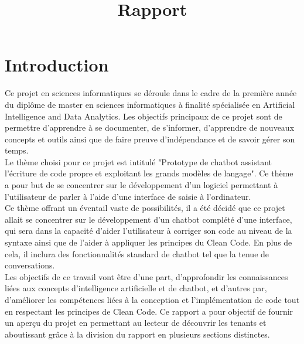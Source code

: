 \documentclass{rapport}
\title{Rapport} %
\begin{document}




        
\fairemarges %
\fairepagedegarde %
\tabledematieres %



\section{Introduction} 
Ce projet en sciences informatiques se déroule dans le cadre de la première année du diplôme de master en sciences informatiques à finalité spécialisée en Artificial Intelligence and Data Analytics. Les objectifs principaux de ce projet sont de permettre d'apprendre à se documenter, de s'informer, d'apprendre de nouveaux concepts et outils ainsi que de faire preuve d'indépendance et de savoir gérer son temps.\\

Le thème choisi pour ce projet est intitulé "Prototype de chatbot assistant l'écriture de code propre et exploitant les grands modèles de langage". Ce thème a pour but de se concentrer sur le développement d'un logiciel permettant à l'utilisateur de parler à l'aide d'une interface de saisie à l'ordinateur.\\

Ce thème offrant un éventail vaste de possibilités, il a été décidé que ce projet allait se concentrer sur le développement d'un chatbot complété d'une interface, qui sera dans la capacité d'aider l'utilisateur à corriger son code au niveau de la syntaxe ainsi que de l'aider à appliquer les principes du Clean Code. En plus de cela, il inclura des fonctionnalités standard de chatbot tel que la tenue de conversations.\\

Les objectifs de ce travail vont être d'une part, d'approfondir les connaissances liées aux concepts d'intelligence artificielle et de chatbot, et d'autres par, d'améliorer les compétences liées à la conception et l'implémentation de code tout en respectant les principes de Clean Code.
Ce rapport a pour objectif de fournir un aperçu du projet en permettant au lecteur de découvrir les tenants et aboutissant grâce à la division du rapport en plusieurs sections distinctes.\\
\end{document}
